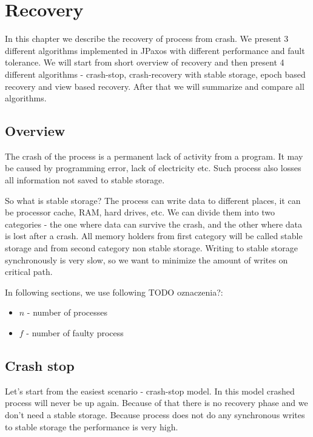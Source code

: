 \chapter{Recovery}

In this chapter we describe the recovery of process from crash. We present 3 different algorithms implemented in JPaxos with different performance and fault tolerance. We will start from short overview of recovery and then present 4 different algorithms - crash-stop, crash-recovery with stable storage, epoch based recovery and view based recovery. After that we will summarize and compare all algorithms.

\section{Overview}

The crash of the process is a permanent lack of activity from a program. It may be caused by programming error, lack of electricity etc. Such process also losses all information not saved to stable storage.

So what is stable storage? The process can write data to different places, it can be processor cache, RAM, hard drives, etc. We can divide them into two categories - the one where data can survive the crash, and the other where data is lost after a crash. All memory holders from first category will be called stable storage and from second category non stable storage. Writing to stable storage synchronously is very slow, so we want to minimize the amount of writes on critical path.

In following sections, we use following TODO oznaczenia?: 
\begin{itemize}
  \item $n$ - number of processes
  \item $f$ - number of faulty process
\end{itemize}

\section{Crash stop}
\label{sec:crash_stop}

Let's start from the easiest scenario - crash-stop model. In this model crashed process will never be up again.
Because of that there is no recovery phase and we don't need a stable storage. Because process does not do any synchronous writes to stable storage the performance is very high. 

